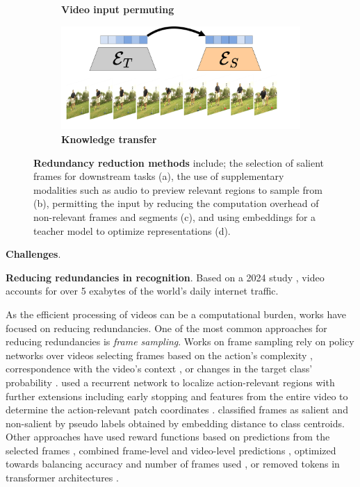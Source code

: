 \documentclass[smallextended,twocolumn,natbib]{svjour3}
\begin{document}
\begin{figure}[t]
\begin{subfigure}[b]{0.49\linewidth}
         \caption{\textbf{Video input permuting}}
         \label{fig:redundancies_reduction::permute}
     \end{subfigure}
     \hfill
     \begin{subfigure}[b]{0.49\linewidth}
         \centering
         \includegraphics[width=\linewidth]{figs/redundancies_reduction/redudancies_transfer.pdf}
         \caption{\textbf{Knowledge transfer}}
         \label{fig:redundancies_reduction::transfer}
     \end{subfigure}
        \caption{\textbf{Redundancy reduction methods} include; the selection of salient frames for downstream tasks (a), the use of supplementary modalities such as audio to preview relevant regions to sample from (b), permitting the input by reducing the computation overhead of non-relevant frames and segments (c), and using embeddings for a teacher model to optimize representations (d). }
        \label{fig:redundancies_reduction}
\end{figure}

\noindent
\textbf{Challenges}.


\noindent
\textbf{Reducing redundancies in recognition}. Based on a 2024 study \citep{sandvine2024global}, video accounts for over 5 exabytes of the world's daily internet traffic. 

As the efficient processing of videos can be a computational burden, works have focused on reducing redundancies. One of the most common approaches for reducing redundancies is \emph{frame sampling}. Works on frame sampling rely on policy networks over videos selecting frames based on the action's complexity \citep{ghodrati2021frameexit,yeung2016end}, correspondence with the video's context \citep{wu2019adaframe}, or changes in the target class' probability \citep{korbar2019scsampler}. \citet{wang2021adaptive} used a recurrent network to localize action-relevant regions with further extensions including early stopping \citep{wang2022adafocus} and features from the entire video to determine the action-relevant patch coordinates \citep{wang2022adafocusv3}. \citet{xia2022nsnet} classified frames as salient and non-salient by pseudo labels obtained by embedding distance to class centroids. Other approaches have used reward functions based on predictions from the selected frames \citep{wu2020dynamic}, combined frame-level and video-level predictions \citep{gowda2021smart}, optimized towards balancing accuracy and number of frames used \citep{wu2019liteeval}, or removed tokens in transformer architectures \citep{wu2024haltingvt}.
\end{document}
